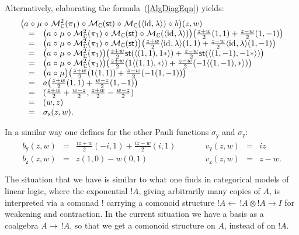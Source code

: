\documentclass{LMCS}
\newcommand{\after}{\mathrel{\circ}}
\newcommand{\idmap}[1][]{\ensuremath{\mathrm{id}_{#1}}}
\newcommand{\st}{\ensuremath{\mathsf{st}}}
\newcommand{\Mlt}{\ensuremath{\mathcal{M}}}
\newcommand{\tuple}[1]{\ensuremath{\langle #1 \rangle}}
\begin{document}
\begin{exa}
{Alternatively, elaborating the formula~(\ref{AlgDiagEqn}) yields:
$$\begin{array}{rcl}
\lefteqn{\big(a \after \mu \after \Mlt_{\mathbb{C}}^{2}(\pi_{1}) \after 
   \Mlt_{\mathbb{C}}(\st) \after \Mlt_{\mathbb{C}}(\tuple{\idmap,\lambda})
   \after b\big)(z,w)} \\
& = &
\big(a \after \mu \after \Mlt_{\mathbb{C}}^{2}(\pi_{1}) \after 
   \Mlt_{\mathbb{C}}(\st) \after \Mlt_{\mathbb{C}}(\tuple{\idmap,\lambda})\big)
   \big(\frac{z+w}{2}(1,1) + \frac{z-w}{2}(1,-1)\big) \\
& = &
\big(a \after \mu \after \Mlt_{\mathbb{C}}^{2}(\pi_{1}) \after 
   \Mlt_{\mathbb{C}}(\st)\big)
   \big(\frac{z+w}{2}\tuple{\idmap,\lambda}(1,1) + 
   \frac{z-w}{2}\tuple{\idmap,\lambda}(1,-1)\big) \\
& = &
\big(a \after \mu \after \Mlt_{\mathbb{C}}^{2}(\pi_{1})\big)
   \big(\frac{z+w}{2}\st(\tuple{(1,1), 1*}) + 
   \frac{z-w}{2}\st(\tuple{(1,-1), -1*})\big) \\
& = &
\big(a \after \mu \after \Mlt_{\mathbb{C}}^{2}(\pi_{1})\big)
   \big(\frac{z+w}{2}(1\tuple{(1,1), *}) + 
   \frac{z-w}{2}(-1\tuple{(1,-1), *})\big) \\
& = &
\big(a \after \mu\big) \big(\frac{z+w}{2}(1(1,1)) + 
   \frac{z-w}{2}(-1(1,-1))\big) \\
& = &
a\big(\frac{z+w}{2}(1,1) + \frac{w-z}{2}(1,-1)\big) \\
& = &
(\frac{z+w}{2} + \frac{w-z}{2}, \frac{z+w}{2} - \frac{w-z}{2}) \\
& = &
(w, z) \\
& = &
\sigma_{\textsf{x}}(z,w).
\end{array}$$
}

\noindent In a similar way one defines for the other Pauli functions
$\sigma_{\textsf{y}}$ and $\sigma_{\textsf{z}}$:
$$\begin{array}{rclcrcl}
b_{\textsf{y}}(z,w)
& = &
\frac{iz+w}{2}(-i,1) + \frac{iz-w}{2}(i,1)
& \qquad &
v_{\textsf{y}}(z,w)
& = &
iz \\
b_{\textsf{z}}(z,w)
& = &
z(1,0) - w(0,1)
& \qquad &
v_{\textsf{z}}(z,w)
& = &
z-w.
\end{array}$$



\end{exa}







\noindent The situation that we have is similar to what one finds in categorical
models of linear logic, where the exponential $!A$, giving arbitrarily
many copies of $A$, is interpreted via a comonad $!$ carrying a
comonoid structure $!A \leftarrow\, !A\otimes !A \rightarrow I$ for
weakening and contraction. In the current situation we have a basis as
a coalgebra $A\rightarrow\, !A$, so that we get a comonoid structure
on $A$, instead of on $!A$.
\end{document}
